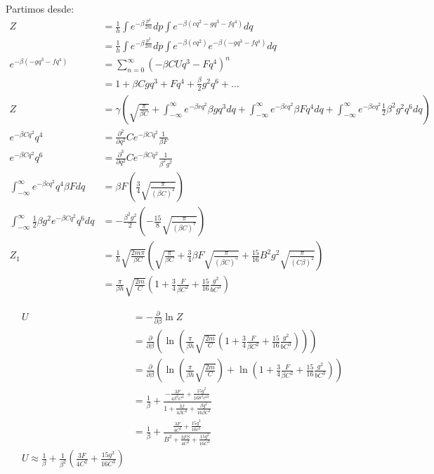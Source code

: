 \documentclass{report}
\begin{document}
Partimos desde:
\begin{align*}
	Z &= \frac{1}{h} \int e^{-\beta \frac{p^2}{2m}} dp \int e^{-\beta \left( cq^2 - gq^3 - fq^4 \right)} dq\\
	&= \frac{1}{h} \int e^{-\beta \frac{p^2}{2m}} dp \int e^{-\beta \left( cq^2\right)}e^{-\beta\left(- gq^3 - fq^4 \right)} dq\\
	e^{-\beta\left(- gq^3 - fq^4 \right)} &= \sum_{n = 0}^{\infty} \left(-\beta CU q^3 - Fq^4\right)^n\\
	& = 1 + \beta Cgq^3 + F q^4 + \frac{\beta}{2} g^2 q^6 + \dots\\
	Z&= \gamma \left( \sqrt{\frac{\pi}{\beta C}} + \int_{-\infty}^{\infty} e^{-\beta rq^2} \beta gq^3 dq + \int_{-\infty}^{\infty} e^{-\beta cq^2} \beta F q^4 dq + \int_{-\infty}^{\infty} e^{-\beta cq^2} \frac{1}{2} \beta^2 g^2 q^6 dq\right)\\
	e^{-\beta C q^2}q^4 &= \frac{\partial^2}{\partial q^2} C e^{-\beta Cq^2} \frac{1}{\beta F}\\
	e^{-\beta C q^2}q^6 &= \frac{\partial^3}{\partial q^3} C e^{-\beta Cq^2} \frac{1}{\beta^2 g^2}\\
	\int_{-\infty}^{\infty} e^{-\beta cq^2} q^4 \beta F dq &= \beta F \left( \frac{3}{4} \sqrt{\frac{\pi}{\left( \beta C \right)^2}} \right)\\
	\int_{-\infty}^{\infty} \frac{1}{2} \beta g^2 e^{-\beta Cq^2} q^6 dq &= - \frac{\beta^2 g^2}{2} \left( - \frac{15}{8} \sqrt{\frac{\pi}{\left( \beta C \right)^7}}\right)\\
	Z_1 &= \frac{1}{h} \sqrt{\frac{2m\pi}{\beta C}} \left( \sqrt{\frac{\pi}{\beta C}} + \frac{3}{4} \beta F \sqrt{\frac{\pi}{\left(\beta C\right)^5}} + \frac{15}{16} B^2 g^2 \sqrt{\frac{\pi}{\left( C\beta \right)^2}} \right)\\
	&= \frac{\pi}{\beta h} \sqrt{\frac{2m}{C}} \left( 1 + \frac{3}{4} \frac{F}{\beta C^2} + \frac{15}{16} \frac{g^2}{bC^3} \right)
\end{align*}

\begin{align*}
	U &= - \frac{\partial}{\partial \beta} \ln Z\\
	&= \frac{\partial}{\partial \beta} \left( \ln \left( \frac{\pi}{\beta h} \sqrt{\frac{2m}{C}} \left( 1 + \frac{3}{4} \frac{F}{\beta C^2} + \frac{15}{16} \frac{g^2}{bC^3} \right) \right) \right)\\
	&= \frac{\partial}{\partial \beta} \left( \ln \left( \frac{\pi}{\beta h} \sqrt{\frac{2m}{C}}\right) + \ln \left( 1 + \frac{3}{4} \frac{F}{\beta C^2} + \frac{15}{16} \frac{g^2}{bC^3} \right) \right)\\
	&= \frac{1}{\beta} + \frac{-\frac{3 F}{4\beta^2C^2} + \frac{15 g^2}{16 8^2 c^63}}{1 + \frac{3f}{4\beta C^2} + \frac{\beta g^2}{16 \beta C^3}}\\
	&= \frac{1}{\beta} + \frac{\frac{3F}{4C^2} + \frac{15 g^2}{16 c^3}}{B^2 + \frac{3F\beta}{4C^2} + \frac{15 g^2}{16 C^3}}\\
	U \approx \frac{1}{\beta} + \frac{1}{\beta^2} \left( \frac{3 F}{4C^2} + \frac{15 g^2}{16 C^3} \right)
\end{align*}
\end{document}

